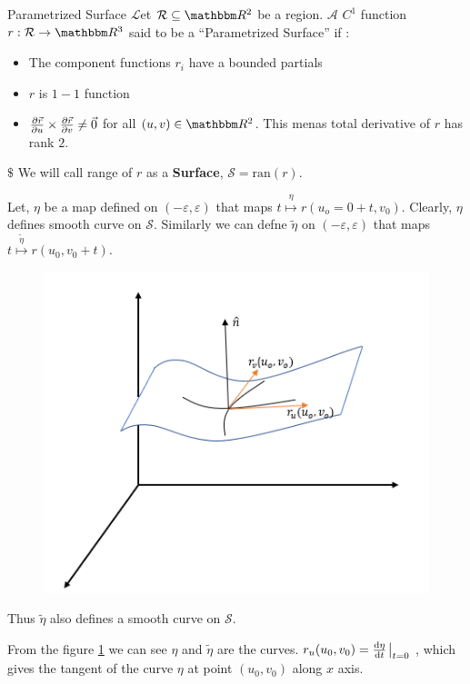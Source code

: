 \documentclass[Analysis-3]{subfiles}
\begin{document}
\begin{Def}{Parametrized Surface}{}\label{def:ps}
    $\mathcal{L}$et $\mathcal{R} \subseteq \R^2$ be a region. $\mathcal{A}$ $C^1$ function $r:\mathcal{R} \to \R^3$ said to be a \enquote{Parametrized Surface} if :
  \begin{itemize}
    \item The component functions $r_i$ have a bounded partials
    \item $r$ is $1-1$ function
    \item $\pdv{\vec{r}}{u} \times \pdv{\vec{r}}{v} \neq \vec{0}$ for all $(u,v) \in \R^2$. This menas total derivative of $r$ has rank $2$.
  \end{itemize}
 $\$$ We will call range of $r$ as a \textbf{Surface}, $ \mathcal{S} = \text{ran}(r)$.
\end{Def}

Let, $\eta$ be a map defined on $(-\varepsilon,\varepsilon)$ that maps $t \overset{\eta}{\mapsto} r(u_o=0 + t,v_0)$. Clearly, $\eta$ defines smooth curve on $\mathcal{S}$. Similarly we can defne $\tilde{\eta}$ on $(-\varepsilon,\varepsilon)$ that maps $t \overset{\tilde{\eta}}{\mapsto} r(u_0,v_0+t)$.

\begin{figure}
    \centering
    \includegraphics[width=.78\linewidth]{figures/lec-24.2.png}
    \caption{\label{fig24:1}}
\end{figure}


Thus $\tilde{\eta}$ also defines a smooth curve on $\mathcal{S}$.

\vspace{0.2cm}

From the figure \ref{fig24:1} we can see $\eta$ and $\tilde{\eta}$ are the curves. $r_u(u_0,v_0)=\dv{\eta}{t}\eval_{t=0}$ , which gives the tangent of the curve $\eta$ at point $(u_0,v_0)$ along $x$ axis.
\end{document}

